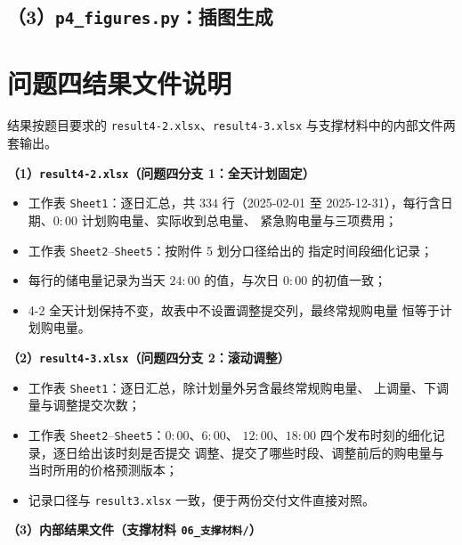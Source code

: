 \documentclass[withoutpreface,bwprint]{cumcmthesis}
\begin{document}
\begin{appendices}
\subsection*{（3）\texttt{p4\_figures.py}：插图生成}


\newpage
\section{问题四结果文件说明}

结果按题目要求的 \texttt{result4-2.xlsx}、\texttt{result4-3.xlsx}
与支撑材料中的内部文件两套输出。

\textbf{（1）\texttt{result4-2.xlsx}（问题四分支 1：全天计划固定）}

\begin{itemize}
  \item 工作表 \texttt{Sheet1}：逐日汇总，共 $334$ 行（2025-02-01 至
        2025-12-31），每行含日期、$0{:}00$ 计划购电量、实际收到总电量、
        紧急购电量与三项费用；
  \item 工作表 \texttt{Sheet2}--\texttt{Sheet5}：按附件 5 划分口径给出的
        指定时间段细化记录；
  \item 每行的储电量记录为当天 $24{:}00$ 的值，与次日 $0{:}00$ 的初值一致；
  \item 4-2 全天计划保持不变，故表中不设置调整提交列，最终常规购电量
        恒等于计划购电量。
\end{itemize}

\textbf{（2）\texttt{result4-3.xlsx}（问题四分支 2：滚动调整）}

\begin{itemize}
  \item 工作表 \texttt{Sheet1}：逐日汇总，除计划量外另含最终常规购电量、
        上调量、下调量与调整提交次数；
  \item 工作表 \texttt{Sheet2}--\texttt{Sheet5}：$0{:}00$、$6{:}00$、
        $12{:}00$、$18{:}00$ 四个发布时刻的细化记录，逐日给出该时刻是否提交
        调整、提交了哪些时段、调整前后的购电量与当时所用的价格预测版本；
  \item 记录口径与 \texttt{result3.xlsx} 一致，便于两份交付文件直接对照。
\end{itemize}

\textbf{（3）内部结果文件（支撑材料 \texttt{06\_支撑材料/}）}


\end{appendices}
\end{document}
